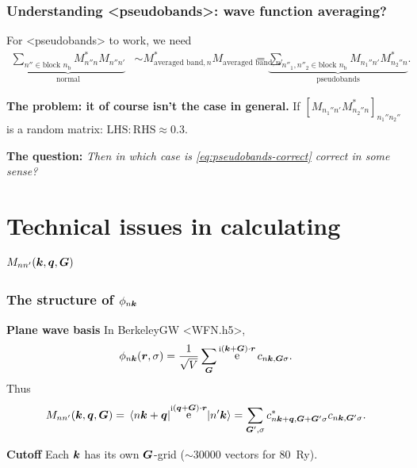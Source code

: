 \documentclass[t]{beamer}
\DeclareMathOperator{\ee}{e}
\DeclareMathOperator{\ii}{i}
\newcommand{\shortcode}[1]{\texttt{#1}}
\def\\{}%
\def\texttt#1{<#1>}%
\begin{document}
\begin{frame}
\frametitle{Understanding \shortcode{pseudobands}: wave function averaging?}

For \shortcode{pseudobands} to work, we need 
\begin{equation}
    \begin{aligned}
        \underbrace{
            \sum_{n'' \in \text{block $n_{\text{b}}$}} M_{n'' n}^* M_{n'' n'} 
        }_{\text{normal}}
        &\sim M_{\text{averaged band}, n}^* M_{\text{averaged band}, n'} \\
        &= \underbrace{
            \sum_{n''_1, n''_2 \in \text{block $n_{\text{b}}$}} M_{n_1'' n'} M_{n_2'' n}^*
        }_{\text{pseudobands}}.
    \end{aligned}
    \label{eq:pseudobands-correct}
\end{equation}

\textbf{The problem: it of course isn't the case in general.}
If $[M_{n_1'' n'} M_{n_2'' n}^*]_{n_1'' n_2''}$ is a random matrix: 
$\text{LHS}:\text{RHS} \approx 0.3$.

\vspace{0.5cm}

\textbf{The question:} \emph{Then in which case is \eqref{eq:pseudobands-correct} correct in some sense?} 

\end{frame}

\section{Technical issues in calculating $M_{nn'}(\vb*{k}, \vb*{q}, \vb*{G})$}

\begin{frame}
\frametitle{The structure of $\phi_{n \vb*{k}}$}

\textbf{Plane wave basis} In BerkeleyGW \shortcode{WFN.h5}, 
\begin{equation}
    \phi_{n \vb*{k}}(\vb*{r}, \sigma) = \frac{1}{\sqrt{V}} \sum_{\vb*{G}} \ee^{\ii (\vb*{k} + \vb*{G}) \cdot \vb*{r}} c_{n \vb*{k}, \vb*{G} \sigma}.
\end{equation}    
Thus 
\begin{equation}
    M_{nn'}(\vb*{k}, \vb*{q}, \vb*{G}) 
    = \mel*{n \vb*{k} + \vb*{q}}{\ee^{\ii (\vb*{q} + \vb*{G}) \cdot \vb*{r}}}{n' \vb*{k}} 
    = \sum_{\vb*{G}', \sigma} c^*_{n \vb*{k} + \vb*{q}, \vb*{G} + \vb*{G}' \sigma} c_{n \vb*{k}, \vb*{G}' \sigma}.
\end{equation}

\textbf{Cutoff} Each $\vb*{k}$ has its own $\vb*{G}$-grid ($\sim 30000$ vectors for \SI{80}{Ry}).

\end{frame}
\end{document}
